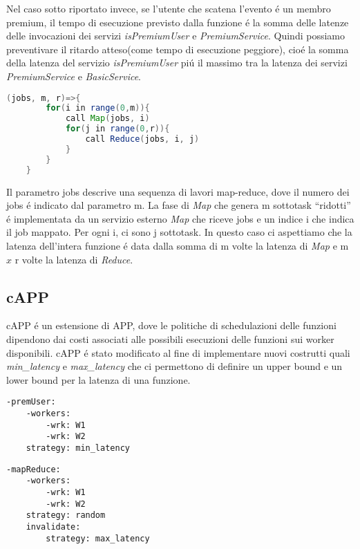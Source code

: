 \documentclass[../../main.tex]{subfiles}
\begin{document}
Nel caso sotto riportato invece, se l'utente che scatena l'evento é un membro premium, il tempo di esecuzione previsto dalla funzione é la somma delle latenze delle invocazioni dei servizi \textit{isPremiumUser} e \textit{PremiumService}.
Quindi possiamo preventivare il ritardo atteso(come tempo di esecuzione peggiore), cioé la somma della latenza del servizio \textit{isPremiumUser} piú il massimo tra la latenza dei servizi \textit{PremiumService} e \textit{BasicService}.

\begin{lstlisting}[language=Java, caption=Funzione con logica Map-Reduce,label={lst:3}]
    (jobs, m, r)=>{
        for(i in range(0,m)){
            call Map(jobs, i)
            for(j in range(0,r)){
                call Reduce(jobs, i, j)
            }
        }
    }
\end{lstlisting}
Il parametro jobs descrive una sequenza di lavori map-reduce, dove il numero dei jobs é indicato dal parametro m.
La fase di \textit{Map} che genera m sottotask ``ridotti'' é implementata da un servizio esterno \textit{Map} che riceve jobs e un indice i che indica il job mappato.
Per ogni i, ci sono j sottotask.
In questo caso ci aspettiamo che la latenza dell'intera funzione é data dalla somma di m volte la latenza di \textit{Map} e m $x$ r volte la latenza di \textit{Reduce}.\autocite{de2023custom}\\
\subsection{cAPP}
\label{cApp}
cAPP é un estensione di APP, dove le politiche di schedulazioni delle funzioni dipendono dai costi associati alle possibili esecuzioni delle funzioni sui worker disponibili.
\autocite {deserverless}
cAPP é stato modificato al fine di implementare nuovi costrutti quali \textit{min\_latency} e \textit{max\_latency} che ci permettono di definire un upper bound e un lower bound per la latenza di una funzione.
\begin{multicols}{2}
    \begin{lstlisting}[caption={cAPP for Listing \ref{lst:1} e \ref{lst:2}},label={lst:4}]
-premUser:
    -workers:
        -wrk: W1
        -wrk: W2
    strategy: min_latency
    \end{lstlisting}
    \columnbreak
    \begin{lstlisting}[caption={cAPP for Listing~\ref{lst:3}}, label={lst:5}]
-mapReduce:
    -workers:
        -wrk: W1
        -wrk: W2
    strategy: random
    invalidate:
        strategy: max_latency
    \end{lstlisting}
\end{multicols}
\end{document}
